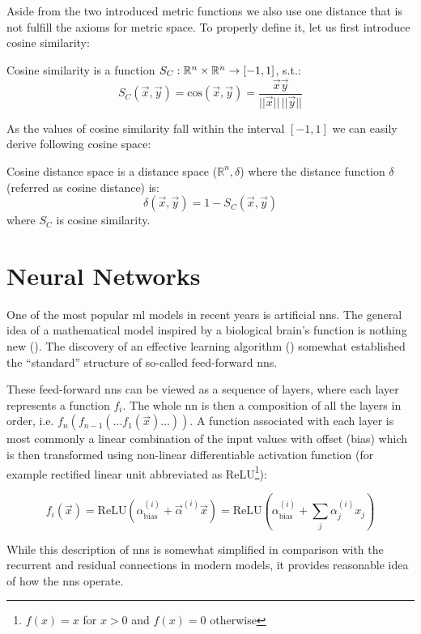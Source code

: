 Aside from the two introduced metric functions we also use one distance that is not fulfill the axioms for metric space. To properly define it, let us first introduce cosine similarity:

\begin{defn}
Cosine similarity is a function $S_C : \mathbb{R}^n \times \mathbb{R}^n \rightarrow [-1, 1]$, s.t.:
$$S_C(\vec{x}, \vec{y}) = \mathrm{cos}(\vec{x}, \vec{y}) = \frac{\vec{x}\vec{y}}{||\vec{x}||\,||\vec{y}||}$$
\end{defn}
As the values of cosine similarity fall within the interval $[-1,1]$ we can
easily derive following cosine space:
\begin{defn}
Cosine distance space is a distance space ($\mathbb{R}^n, \delta$) where the distance
function $\delta$ (referred as cosine distance) is:
$$\delta(\vec{x}, \vec{y}) = 1 - S_C(\vec{x}, \vec{y})$$
where $S_C$ is cosine similarity.
\end{defn}

\section{Neural Networks}
\label{sec:nn}

One of the most popular \gls{ml} models in recent years is artificial \glspl{nn}. The general idea of a mathematical model inspired by a biological brain's function is nothing new (\cite{first_nn}). The discovery of an effective learning algorithm (\cite{backprop}) somewhat established the ``standard'' structure of so-called feed-forward \glspl{nn}.

These feed-forward \glspl{nn} can be viewed as a sequence of layers, where each layer represents a function $f_i$. The whole \gls{nn} is then a composition of all the layers in order, i.e. $f_n(f_{n-1}(\ldots f_1(\vec{x})\ldots))$. A function associated with each layer is most commonly a linear combination of the input values with offset (bias) which is then transformed using non-linear differentiable activation function (for example rectified linear unit abbreviated as ReLU\footnote{$f(x) = x$ for $x > 0$ and $f(x) = 0$ otherwise}):

\begin{equation}
    \label{eq:dense}
    f_i(\vec{x}) = \mathrm{ReLU}\left(\alpha_{\mathrm{bias}}^{(i)} + \vec{\alpha}^{(i)} \vec{x}\right) = \mathrm{ReLU}\left(\alpha_{\mathrm{bias}}^{(i)} + \sum_{j}\alpha_j^{(i)}x_j\right)
\end{equation}

While this description of \glspl{nn} is somewhat simplified in comparison with the recurrent and residual connections in modern models, it provides reasonable idea of how the \glspl{nn} operate.

